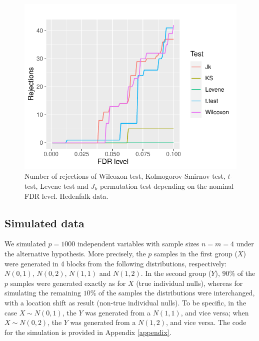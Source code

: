 \begin{figure}[htb]
	\centering
	\includegraphics[width=1\textwidth]{ima2.pdf}
	\caption{Number of rejections of Wilcoxon test, Kolmogorov-Smirnov test, $t$-test, Levene test and $J_k$ permutation test depending on the nominal FDR level. Hedenfalk data.}
	\label{fig:2}
\end{figure}

\subsection{Simulated data}\label{se:simul}



We simulated $p=1000$ independent variables with sample sizes $n=m=4$ under the alternative hypothesis. More precisely, the $p$ samples in the first group ($X$) were generated in 4 blocks from  the following distributions, respectively:
$N(0,1)$, $N(0,2)$, $N(1,1)$ and $N(1,2)$. In the second group ($Y$), $90\%$ of the $p$ samples were generated exactly as for $X$ (true individual nulls), whereas for simulating the remaining $10\%$ of the samples the distributions were interchanged, with a location shift as result (non-true individual nulls). To be specific, in the case $X \sim N(0,1)$, the $Y$ was generated from a $N(1,1)$, and vice versa; when $X \sim N(0,2)$, the $Y$ was generated from a $N(1,2)$, and vice versa. The code for the simulation is provided in Appendix \ref{appendix}.

